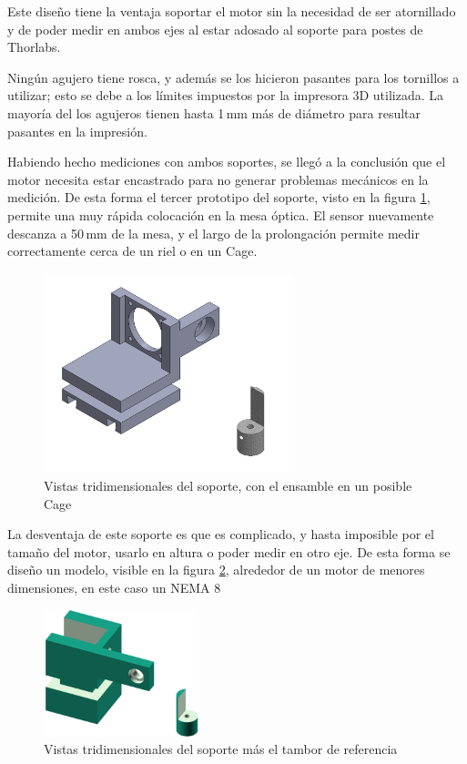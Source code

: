 Este diseño tiene la ventaja soportar el motor sin la necesidad de ser atornillado y de poder medir en ambos ejes al estar adosado al soporte para postes de Thorlabs.

Ningún agujero tiene rosca, y además se los hicieron pasantes para los tornillos a utilizar; esto se debe a los límites impuestos por la impresora 3D utilizada. La mayoría del los agujeros tienen hasta 1$\,$mm más de diámetro para resultar pasantes en la impresión.

Habiendo hecho mediciones con ambos soportes, se llegó a la conclusión que el motor necesita estar encastrado para no generar problemas mecánicos en la medición. De esta forma el tercer prototipo del soporte, visto en la figura \ref{fig:perfilador/soporte_v3}, permite una muy rápida colocación en la mesa óptica. El sensor nuevamente descanza a 50$\,$mm de la mesa, y el largo de la prolongación permite medir correctamente cerca de un riel o en un Cage.

\begin{figure}[H]
\centering
\includegraphics[width=0.65\textwidth]{fig/perfilador/soporte_v3}
\caption{Vistas tridimensionales del soporte, con el ensamble en un posible Cage}
\label{fig:perfilador/soporte_v3}
\end{figure}

La desventaja de este soporte es que es complicado, y hasta imposible por el tamaño del motor, usarlo en altura o poder medir en otro eje. De esta forma se diseño un modelo, visible en la figura \ref{fig:perfilador/soporte_v4}, alrededor de un motor de menores dimensiones, en este caso un NEMA 8 

\begin{figure}[H]
    \centering
    \includegraphics[width=0.4\textwidth]{fig/perfilador/soporte_v4}
    \caption{Vistas tridimensionales del soporte más el tambor de referencia}
    \label{fig:perfilador/soporte_v4}
\end{figure}

